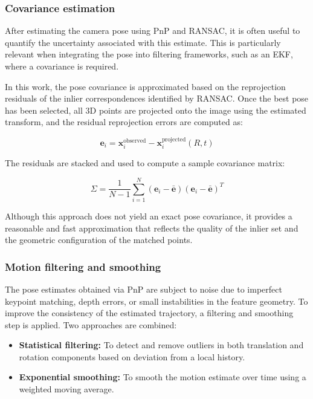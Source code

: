 \subsubsection{Covariance estimation}\label{sec:CovarianceEstimation}

After estimating the camera pose using \gls{PnP} and \gls{RANSAC}, it is often useful to quantify the uncertainty 
associated with this estimate. This is particularly relevant when integrating the pose into filtering 
frameworks, such as an \gls{EKF}, where a covariance is required.

In this work, the pose covariance is approximated based on the reprojection residuals of the inlier 
correspondences identified by \gls{RANSAC}. Once the best pose has been selected, all 3D points are projected 
onto the image using the estimated transform, and the residual reprojection errors are computed as:

\begin{equation}
\mathbf{e}_i = \mathbf{x}_i^{\text{observed}} - \mathbf{x}_i^{\text{projected}}(R, t)
\end{equation}

The residuals are stacked and used to compute a sample covariance matrix:

\begin{equation}
\Sigma = \frac{1}{N-1} \sum_{i=1}^N (\mathbf{e}_i - \bar{\mathbf{e}})(\mathbf{e}_i - \bar{\mathbf{e}})^T
\end{equation}


Although this approach does not yield an exact pose covariance, it provides a reasonable and fast 
approximation that reflects the quality of the inlier set and the geometric configuration of the 
matched points.


\subsubsection{Motion filtering and smoothing}\label{sec:MotionFilteringSmoothing}

The pose estimates obtained via \gls{PnP} are subject to noise due to imperfect keypoint matching, depth
errors, or small instabilities in the feature geometry. To improve the consistency of the estimated
trajectory, a filtering and smoothing step is applied.
Two approaches are combined:
\begin{itemize}
  \item \textbf{Statistical filtering:} To detect and remove outliers in both translation and rotation
  components based on deviation from a local history.
  \item \textbf{Exponential smoothing:} To smooth the motion estimate over time using a weighted moving
  average.
\end{itemize}

